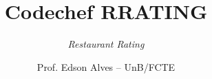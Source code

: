 \title{Codechef RRATING}
\subtitle{\textit{Restaurant Rating}}
\author{Prof. Edson Alves -- UnB/FCTE}
\date{}
